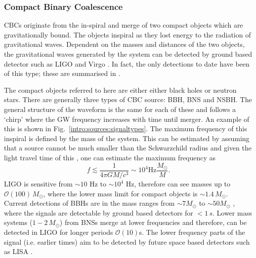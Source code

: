 \subsubsection{\label{sources:transient:cbc}Compact Binary Coalescence}

\glspl{CBC} originate from the in-spiral and merge of two compact objects which are gravitationally bound.
The objects inspiral as they lost energy to the radiation of gravitational waves.
Dependent on the masses and distances of the two objects, the gravitational waves generated by the system can be detected by ground based detector such as \gls{LIGO} \citep{aasi2015AdvancedLIGO} and Virgo \citep{acernese2015AdvancedVirgo}. 
In fact, the only detections to date have been of this type; these are summarised in \citep{ligoscientificcollaborationandvirgocollaboration2019GWTC1GravitationalWave}.

The compact objects referred to here are either either black holes or neutron stars.
There are generally three types of \gls{CBC} source: \gls{BBH}, \gls{BNS} and \gls{NSBH}.
The general structure of the waveform is the same for each of these and follows a `chirp' where the \gls{GW} frequency increases with time until merger. An example of this is shown in Fig.~\ref{intro:sources:signaltypes}.
The maximum frequency of this inspiral is defined by the mass of the system.
This can be estimated by assuming that a source cannot be much smaller than the Schwarzchild radius and given the light travel time of this \citep{g2000NeutrinosPhysics}, one can estimate the maximum frequency as
\begin{equation}
    f \lesssim \frac{1}{4 \pi G M/ c^3}  \sim 10^{4} \mathrm{Hz} \frac{M_{\odot}}{M} .
\end{equation}
\gls{LIGO} is sensitive from $\sim 10$ Hz to $\sim 10^4$ Hz, therefore can see masses up to $\mathcal{O}(100)\, M_{\odot}$, where the lower mass limit for compact objects is $\sim 1.4\, M_{\odot}$. 
Current detections of \glspl{BBH} are in the mass ranges from $\sim 7M_{\odot}$ to $\sim 50M_{\odot}$ \citep{ligoscientificcollaborationandvirgocollaboration2019GWTC1GravitationalWave}, where the signals are detectable by ground based detectors for $< 1\,s$. 
Lower mass systems ($1-2\,M_{\odot}$) from \glspl{BNS} merge at lower frequencies and therefore, can be detected in \gls{LIGO} for longer periods $\mathcal{O}(10)$s. 
The lower frequency parts of the signal (i.e. earlier times) aim to be detected by future space based detectors such as \gls{LISA} \citep{danzmann1996LISALaser}.

